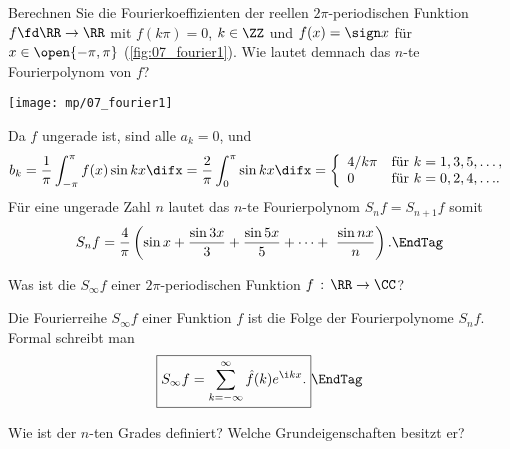  \begin{frage}
    \label{q:565}
    Berechnen Sie die Fourierkoeffizienten der 
    reellen $2\pi$-periodischen 
    Funktion $f\fd  \RR\to \RR$ mit 
    $f(k\pi)=0$, $k\in \ZZ$ und 
    $f(x)=\sign x$ für $x\in \open{-\pi,\pi}$ 
    (\sieheAbbildung\ref{fig:07_fourier1}). 
    Wie lautet demnach das $n$-te Fourierpolynom von $f$?
  \end{frage}

  \begin{center}
    \texttt{[image: mp/07\_fourier1]}
    \label{fig:07_fourier1}
  \end{center}

  \begin{antwort}
    Da $f$ ungerade ist, sind alle $a_k=0$, und 
    \[
    b_k=\frac{1}{\pi} \int_{-\pi}^\pi f(x)\sin kx \difx =
    \frac{2}{\pi} \int_{0}^\pi \sin kx \difx =
    \left\{
      \begin{array}{ll}
        4/{k\pi} & \text{für $k=1,3,5,\ldots,$} \\
        0        & \text{für $k=0,2,4,\ldots$.}
      \end{array}
    \right.
    \]
    Für eine ungerade Zahl $n$ 
    lautet das $n$-te Fourierpolynom $S_nf=S_{n+1}f$ somit
    \begin{equation}
      S_n f= \frac{4}{\pi} \left( \sin x+\frac{\sin 3x}{3}
        +\frac{\sin 5x}{5}+\cdots+\
        \frac{\sin nx}{n}
      \right).\EndTag
    \end{equation}
  \end{antwort}

  \begin{frage}
    Was ist die  $S_\infty f$ 
    einer $2\pi$-periodischen 
    Funktion $f\,:\,\RR\to\CC$?
  \end{frage}

  \begin{antwort}
    Die Fourierreihe $S_\infty f$ einer Funktion $f$ ist die Folge 
    der Fourierpolynome $S_n f$. Formal schreibt man 
    \begin{equation}
      \boxed{
        S_\infty f = \sum_{k=-\infty}^\infty \hat{f}(k) e^{\i kx}.}
      \EndTag
    \end{equation} 
  \end{antwort}

  \begin{frage}
    Wie ist der \bold{Dirichlet-Kern} $n$-ten Grades definiert? 
    Welche Grundeigenschaften besitzt er?
  \end{frage}

